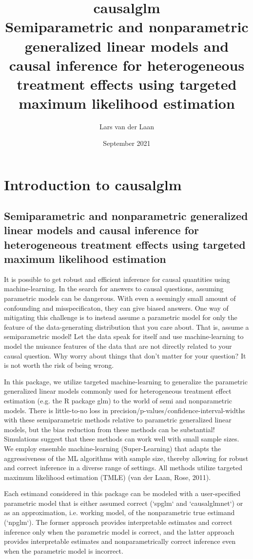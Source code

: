 \documentclass{article}
\title{%
  causalglm \\
  \vspace{0.3cm}
  \large Semiparametric and nonparametric generalized linear models and causal inference for heterogeneous treatment effects using targeted maximum likelihood estimation 
  }
\author{Lars van der Laan }
\date{September 2021}
\begin{document}


\maketitle



\section{Introduction to causalglm}
\subsection{Semiparametric and nonparametric generalized linear models and causal inference for heterogeneous treatment effects using targeted maximum likelihood estimation}


It is possible to get robust and efficient inference for causal quantities using machine-learning. In the search for answers to causal questions, assuming parametric models can be dangerous. With even a seemingly small amount of confounding and misspecificaton, they can give biased answers. One way of mitigating this challenge is to instead assume a parametric model for only the feature of the data-generating distribution that you care about. That is, assume a semiparametric model! Let the data speak for itself and use machine-learning to model the nuisance features of the data that are not directly related to your causal question. Why worry about things that don't matter for your question? It is not worth the risk of being wrong.

In this package, we utilize targeted machine-learning to generalize the parametric generalized linear models commonly used for heterogeneous treatment effect estimation (e.g. the R package glm) to the world of semi and nonparametric models. There is little-to-no loss in precision/p-values/confidence-interval-widths with these semiparametric methods relative to parametric generalized linear models, but the bias reduction from these methods can be substantial! Simulations suggest that these methods can work well with small sample sizes. We employ ensemble machine-learning (Super-Learning) that adapts the aggressiveness of the ML algorithms with sample size, thereby allowing for robust and correct inference in a diverse range of settings. All methods utilize targeted maximum likelihood estimation (TMLE) (van der Laan, Rose, 2011).\nocite{vanderLaanRose2011}

Each estimand considered in this package can be modeled with a user-specified parametric model that is either assumed correct (`spglm` and `causalglmnet`) or as an approximation, i.e. working model, of the nonparametric true estimand (`npglm`). The former approach provides interpretable estimates and correct inference only when the parametric model is correct, and the latter approach provides interpretable estimates and nonparametrically correct inference even when the parametric model is incorrect.
\end{document}
